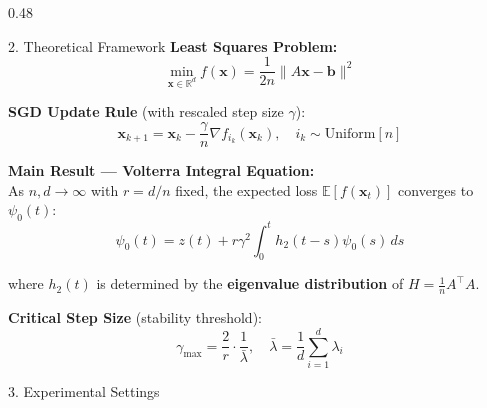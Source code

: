 \documentclass[final]{beamer}
\begin{document}
\begin{frame}[t]
\begin{columns}[t]
\begin{column}{0.48\linewidth}
\begin{block}{2. Theoretical Framework}
\justifying
\textbf{Least Squares Problem:}
\vspace{-0.2cm}
$$\min_{\mathbf{x} \in \mathbb{R}^d} f(\mathbf{x}) = \frac{1}{2n} \|A\mathbf{x} - \mathbf{b}\|^2$$

\textbf{SGD Update Rule} (with rescaled step size $\gamma$):
\vspace{-0.2cm}
$$\mathbf{x}_{k+1} = \mathbf{x}_k - \frac{\gamma}{n} \nabla f_{i_k}(\mathbf{x}_k), \quad i_k \sim \text{Uniform}[n]$$

\textbf{Main Result --- Volterra Integral Equation:}\\
As $n, d \to \infty$ with $r = d/n$ fixed, the expected loss $\mathbb{E}[f(\mathbf{x}_t)]$ converges to $\psi_0(t)$:
\vspace{-0.1cm}
$$\boxed{\psi_0(t) = z(t) + r\gamma^2 \int_0^t h_2(t-s) \psi_0(s) \, ds}$$

where $h_2(t)$ is determined by the \textbf{eigenvalue distribution} of $H = \frac{1}{n}A^\top A$.

\vspace{0.2cm}
\textbf{Critical Step Size} (stability threshold):
\vspace{-0.2cm}
$$\gamma_{\max} = \frac{2}{r} \cdot \frac{1}{\bar{\lambda}}, \quad \bar{\lambda} = \frac{1}{d}\sum_{i=1}^d \lambda_i$$
\end{block}

\begin{block}{3. Experimental Settings}
\justifying

\begin{center}
\end{center}
\end{block}
\end{column}
\end{columns}
\end{frame}
\end{document}
